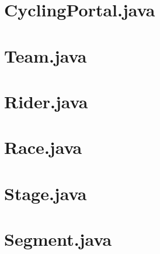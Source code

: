\documentclass{article}
\begin{document}
\section{CyclingPortal.java}


\section{Team.java}


\section{Rider.java}


\section{Race.java}


\section{Stage.java}


\section{Segment.java}

\end{document}
